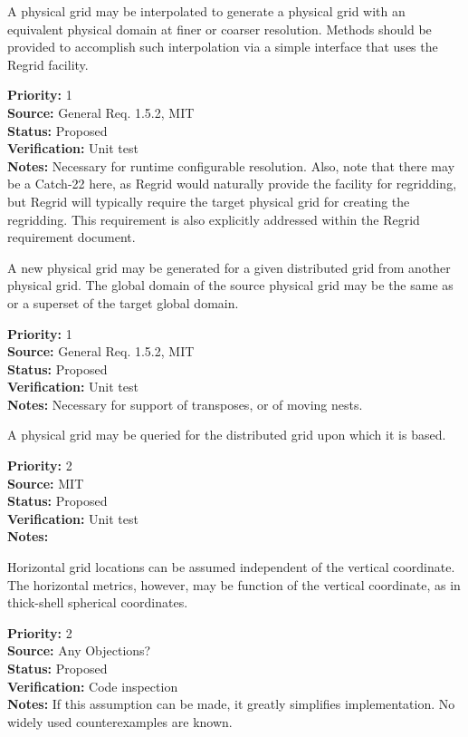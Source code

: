 A physical grid may be interpolated to generate a physical grid with an equivalent physical
domain at finer or coarser resolution.  Methods should be provided to accomplish such
interpolation via a simple interface that uses the Regrid facility.
\begin{reqlist}
{\bf Priority:} 1 \\
{\bf Source:} General Req. 1.5.2, MIT \\
{\bf Status:} Proposed \\
{\bf Verification:} Unit test\\
{\bf Notes:} Necessary for runtime configurable resolution.  Also, note that 
there may be a Catch-22 here, as Regrid would naturally provide the facility
for regridding, but Regrid will typically require the target physical grid for
creating the regridding.  This requirement is also explicitly addressed within the
Regrid requirement document.
\end{reqlist}

A new physical grid may be generated for a given distributed grid from another physical grid.
The global domain of the source physical grid may be the same as or a superset of
the target global domain.
\begin{reqlist}
{\bf Priority:} 1 \\
{\bf Source:} General Req. 1.5.2, MIT \\
{\bf Status:} Proposed \\
{\bf Verification:} Unit test\\
{\bf Notes:} Necessary for support of transposes, or of moving nests.
\end{reqlist}

A physical grid may be queried for the distributed grid upon which it is based.
\begin{reqlist}
{\bf Priority:} 2 \\
{\bf Source:}  MIT\\
{\bf Status:} Proposed \\
{\bf Verification:} Unit test \\
{\bf Notes:} 
\end{reqlist}

Horizontal grid locations can be assumed independent of the vertical coordinate.
The horizontal metrics, however, may be function of the vertical coordinate, as
in thick-shell spherical coordinates.
\begin{reqlist}
{\bf Priority:} 2 \\
{\bf Source:} Any Objections? \\
{\bf Status:} Proposed \\
{\bf Verification:} Code inspection\\
{\bf Notes:} If this assumption can be made, it greatly simplifies implementation.
No widely used counterexamples are known.
\end{reqlist}

